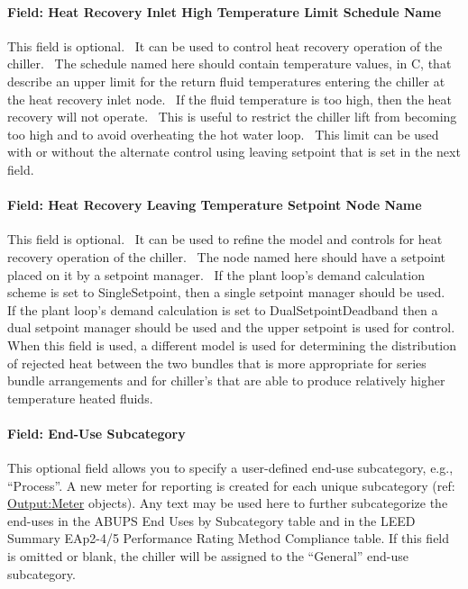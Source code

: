 \paragraph{Field: Heat Recovery Inlet High Temperature Limit Schedule Name}\label{field-heat-recovery-inlet-high-temperature-limit-schedule-name-1}

This field is optional.~ It can be used to control heat recovery operation of the chiller.~ The schedule named here should contain temperature values, in C, that describe an upper limit for the return fluid temperatures entering the chiller at the heat recovery inlet node.~ If the fluid temperature is too high, then the heat recovery will not operate.~ This is useful to restrict the chiller lift from becoming too high and to avoid overheating the hot water loop.~ This limit can be used with or without the alternate control using leaving setpoint that is set in the next field.

\paragraph{Field: Heat Recovery Leaving Temperature Setpoint Node Name}\label{field-heat-recovery-leaving-temperature-setpoint-node-name-1}

This field is optional.~ It can be used to refine the model and controls for heat recovery operation of the chiller.~ The node named here should have a setpoint placed on it by a setpoint manager.~ If the plant loop's demand calculation scheme is set to SingleSetpoint, then a single setpoint manager should be used.~ If the plant loop's demand calculation is set to DualSetpointDeadband then a dual setpoint manager should be used and the upper setpoint is used for control.~ When this field is used, a different model is used for determining the distribution of rejected heat between the two bundles that is more appropriate for series bundle arrangements and for chiller's that are able to produce relatively higher temperature heated fluids.

\paragraph{Field: End-Use Subcategory}

This optional field allows you to specify a user-defined end-use subcategory, e.g., ``Process''. A new meter for reporting is created for each unique subcategory (ref: \hyperref[outputmeter-and-outputmetermeterfileonly]{Output:Meter} objects). Any text may be used here to further subcategorize the end-uses in the ABUPS End Uses by Subcategory table and in the LEED Summary EAp2-4/5 Performance Rating Method Compliance table. If this field is omitted or blank, the chiller will be assigned to the ``General'' end-use subcategory.

